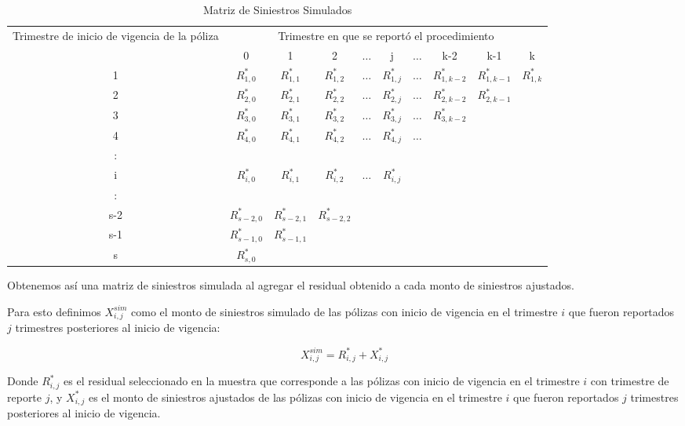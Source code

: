 \documentclass[11pt,twoside,openright,spanish]{report}
\numberwithin{equation}{chapter}
\numberwithin{figure}{chapter}
\numberwithin{table}{chapter}
\begin{document}
	\begin{table}[H]
		\centering
			\caption{Matriz de Siniestros Simulados}
		\begin{tabularx}{\linewidth}{ c |ccccccccc}
			\multirow{2}{4cm}{Trimestre de inicio de vigencia de la póliza}& \multicolumn{9}{c}{Trimestre en que se reportó el procedimiento} \\
			& 0  & 1 & 2 & $ \dots $ & j & $\dots $ & k-2 & k-1 &  k\\
			\midrule
			1      &  $R_{1,0}^{*}$ & $R_{1,1}^{*}$ & $R_{1,2}^{*}$ & $ \dots $ & $R_{1,j}^{*}$ & $ \dots $ & $R_{1,k-2}^{*}$ & $R_{1,k-1}^{*}$ & $R_{1,k}^{*}$ \\
			2      &  $R_{2,0}^{*}$ & $R_{2,1}^{*}$ & $R_{2,2}^{*}$ & $ \dots $ & $R_{2,j}^{*}$ & $ \dots $ & $R_{2,k-2}^{*}$ & $R_{2,k-1}^{*}$ & \\
			3      &  $R_{3,0}^{*}$ & $R_{3,1}^{*}$ & $R_{3,2}^{*}$ & $ \dots $ & $R_{3,j}^{*}$ & $ \dots $ & $R_{3,k-2}^{*}$ & & \\
			4      &  $R_{4,0}^{*}$ & $R_{4,1}^{*}$ & $R_{4,2}^{*}$ & $ \dots $ & $R_{4,j}^{*}$ & $ \dots $ & & & \\
			:      & & & & & & & & & \\
			i      &  $R_{i,0}^{*}$ & $R_{i,1}^{*}$ & $R_{i,2}^{*}$ & $ \dots $ & $R_{i,j}^{*}$ & & & & \\
			:      & & & & & & & & & \\
			s-2      &  $R_{s-2,0}^{*}$ & $R_{s-2,1}^{*}$ & $R_{s-2,2}^{*}$ & & & & & & \\
			s-1      &  $R_{s-1,0}^{*}$ & $R_{s-1,1}^{*}$ & & & & & & & \\
			s      &  $R_{s,0}^{*}$ & & & & & & & & \\
		\end{tabularx}
	\end{table}

	Obtenemos así una matriz de siniestros simulada al agregar el residual obtenido a cada monto de siniestros ajustados.
	
	Para esto definimos $X_{i,j}^{sim}$ como el monto de siniestros simulado de las pólizas con inicio de vigencia en el trimestre $i$ que fueron reportados $j$ trimestres posteriores al inicio de vigencia:
	
	\begin{equation}
    X_{i,j}^{sim}=R_{i,j}^{*}+X_{i,j}^{*} 
\label{eq8}    
\end{equation}
	
	Donde $R_{i,j}^{*}$ es el residual seleccionado en la muestra que corresponde a las pólizas con inicio de vigencia en el trimestre $i$ con trimestre de reporte $j$, y $X_{i,j}^{*}$ es el monto de siniestros ajustados de las pólizas con inicio de vigencia en el trimestre $i$ que fueron reportados $j$ trimestres posteriores al inicio de vigencia.
	
\end{document}
